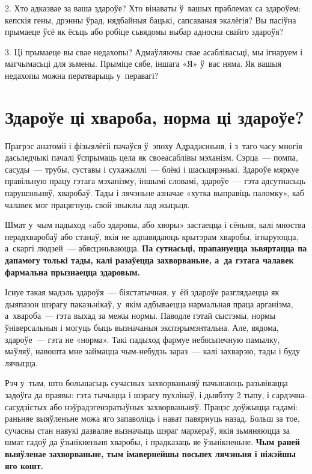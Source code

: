 2. Хто адказвае за ваша здароўе? Хто вінаваты ў~вашых праблемах са здароўем: кепскія гены, дрэнны ўрад, нядбайныя бацькі, сапсаваная экалёгія? Вы пасіўна прымаеце ўсё як ёсьць або робіце сьвядомы выбар адносна свайго здароўя?

3. Ці прымаеце вы свае недахопы? Адмаўляючы свае асаблівасьці, мы ігнаруем і магчымасьці для зьмены. Прыміце сябе, іншага «Я» ў~вас няма. Як вашыя недахопы можна ператварыць у~перавагі?


\section{Здароўе ці хвароба, норма ці здароўе?}


Прагрэс анатоміі і фізыялёгіі пачаўся ў~эпоху Адраджэньня, і з~таго часу многія дасьледчыкі пачалі ўспрымаць цела як своеасаблівы мэханізм. Сэрца~--- помпа, сасуды~--- трубы, суставы і сухажыллі~--- блёкі і шасьцярэнькі. Здароўе мяркуе правільную працу гэтага мэханізму, іншымі словамі, здароўе~--- гэта адсутнасьць парушэньняў, хваробаў. Тады і лячэньне азначае «хутка выправіць паломку», каб чалавек мог працягнуць свой звыклы лад жыцьця.


Шмат у~чым падыход «або здаровы, або хворы» застаецца і сёньня, калі мноства перадхваробаў або станаў, якія не адпавядаюць крытэрам хваробы, ігнаруюцца, а~скаргі людзей~--- абясцэньваюцца. \textbf{Па сутнасьці, прапануецца зьвяртацца па дапамогу толькі тады, калі разаўецца захворваньне, а~да гэтага чалавек фармальна прызнаецца здаровым.}


Існуе такая мадэль здароўя~--- біястатычная, у~ёй здароўе разглядаецца як дыяпазон шэрагу паказьнікаў, у~якім адбываецца нармальная праца арганізма, а~хвароба~--- гэта выхад за межы нормы. Паводле гэтай сыстэмы, нормы ўніверсальныя і могуць быць вызначаныя экспэрымэнтальна. Але, вядома, здароўе~--- гэта не «норма». Такі падыход фармуе небясьпечную памылку, маўляў, навошта мне займацца чым-небудзь зараз~--- калі захварэю, тады і буду лячыцца.

Рэч у~тым, што большасьць сучасных захворваньняў пачынаюць разьвівацца задоўга да праявы: гэта тычыцца і шэрагу пухлінаў, і дыябэту 2 тыпу, і сардэчна-сасудзістых або нэўрадэгенэратыўных захворваньняў. Працэс доўжыцца гадамі: раньняе выяўленьне можа яго запаволіць і нават павярнуць назад. Больш за тое, сучасны стан навукі дазваляе вызначыць шэраг маркераў, якія зьмяняюцца за шмат гадоў да ўзьнікненьня хваробы, і прадказаць яе ўзьнікненьне. \textbf{Чым раней выяўленае захворваньне, тым імавернейшы посьпех лячэньня і ніжэйшы яго кошт.}

